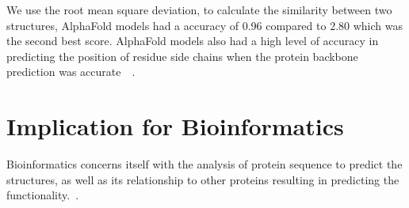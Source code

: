 \documentclass{report}
\begin{document}
We use the root mean square deviation, to calculate the similarity between two structures, AlphaFold models had a accuracy of 0.96 compared to 2.80 which was the second best score. AlphaFold models also had a high level of accuracy in predicting the position of residue side chains when the protein backbone prediction was accurate~\cite{david_alphafold_2022}~\cite{jumper_highly_2021}.


\section{Implication for Bioinformatics}

Bioinformatics concerns itself with the analysis of protein sequence to predict the structures, as well as its relationship to other proteins resulting in predicting the functionality.~\cite{zvelebil_understanding_2008}.



\end{document}
